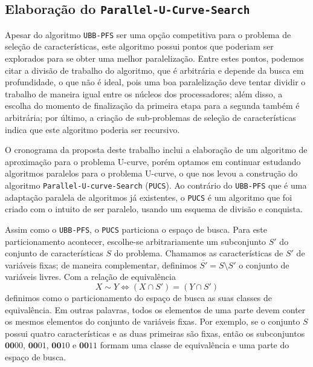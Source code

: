\documentclass[12pt]{article}
\newcommand{\algname}[1]{\texttt{#1}}
\begin{document}
\subsection{Elaboração do \algname{Parallel-U-Curve-Search}}
\label{sec:pucs}
Apesar do algoritmo \algname{UBB-PFS} ser uma opção competitiva para o
problema de seleção de características, este algoritmo possui pontos
que poderiam ser explorados para se obter uma melhor paralelização. 
Entre estes pontos, podemos citar a divisão de trabalho do algoritmo,
que é arbitrária e depende da busca em profundidade, 
o que não é ideal, pois uma boa paralelização deve tentar dividir o 
trabalho de maneira igual entre os núcleos dos processadores; além 
disso, a escolha do momento de finalização da primeira etapa para a 
segunda também é arbitrária; por último, a criação de sub-problemas de
seleção de características indica que este algoritmo poderia ser
recursivo.

O cronograma da proposta deste trabalho inclui a elaboração de um 
algoritmo de aproximação para o problema U-curve, porém optamos em 
continuar estudando algoritmos paralelos para o problema U-curve, o que 
nos levou a construção do algoritmo 
\algname{Parallel\--U-curve\--Search} (\algname{PUCS}). Ao contrário do
\algname{UBB-PFS} que é uma adaptação paralela de algoritmos já 
existentes, o \algname{PUCS} é um algoritmo que foi criado com o intuito
de ser paralelo, usando um esquema de divisão e conquista.

Assim como o \algname{UBB-PFS}, o \algname{PUCS} particiona o espaço de
busca. Para este particionamento acontecer, escolhe-se arbitrariamente
um subconjunto $S'$ do conjunto de características $S$ do problema. 
Chamamos as características de $S'$ de variáveis fixas; de maneira 
complementar, definimos $\overline{S'} = S \setminus S'$ o conjunto de
variáveis livres. Com a relação
de equivalência
\begin{equation}
    X \sim Y \iff (X \cap S')  = (Y \cap S') \nonumber
\end{equation}
definimos como o particionamento do espaço de busca as suas classes de
equivalência. Em outras palavras, todos os elementos de uma parte
devem conter os mesmos elementos do conjunto de variáveis fixas. Por
exemplo, se o conjunto $S$ possui quatro características e as duas
primeiras são fixas, então os subconjuntos $\mathbf{00}00$, 
$\mathbf{00}01$, $\mathbf{00}10$ e $\mathbf{00}11$ formam uma classe de 
equivalência e uma parte do espaço de busca.
\end{document}
